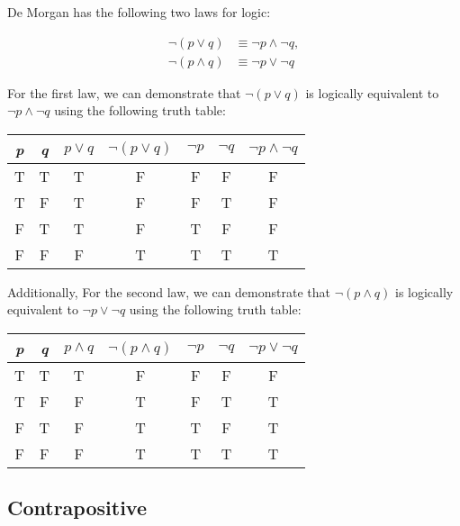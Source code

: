 De Morgan has the following two laws for logic:

\begin{align*}
    \lnot (p \vee q) &\equiv \lnot p \land \lnot q,\\
    \lnot (p \land q) &\equiv \lnot p \vee \lnot q
\end{align*}

\clearpage

For the first law, we can demonstrate that $\lnot (p \vee q)$ is logically equivalent to $\lnot p \land \lnot q$ using the following truth table:

\begin{table}[h]
\centering
\begin{tabular}{|c|c|c|c|c|c|c|}
\hline
\textit{p} & \textit{q} & $p \vee q$ & $\lnot (p \vee q)$ & $\lnot p$ & $\lnot q$ & $\lnot p \land \lnot q$ \\ \hline
T & T & T & F & F & F & F \\ \hline
T & F & T & F & F & T & F \\ \hline
F & T & T & F & T & F & F \\ \hline
F & F & F & T & T & T & T \\ \hline
\end{tabular}
\end{table}

Additionally, For the second law, we can demonstrate that $\lnot (p \land q)$ is logically equivalent to $\lnot p \vee \lnot q$ using the following truth table:

\begin{table}[h]
\centering
\begin{tabular}{|c|c|c|c|c|c|c|}
\hline
\textit{p} & \textit{q} & $p \land q$ & $\lnot (p \land q)$ & $\lnot p$ & $\lnot q$ & $\lnot p \vee \lnot q$ \\ \hline
T & T & T & F & F & F & F \\ \hline
T & F & F & T & F & T & T \\ \hline
F & T & F & T & T & F & T \\ \hline
F & F & F & T & T & T & T \\ \hline
\end{tabular}
\end{table}

\subsection*{Contrapositive}


